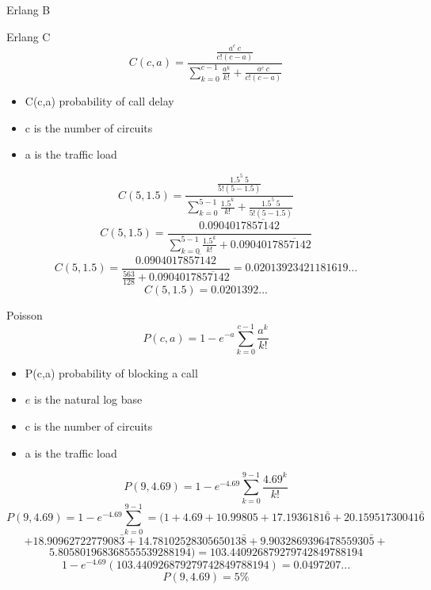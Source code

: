 \documentclass[landscape,fontscale=1,margin=0.2cm,paperwidth=70truecm, paperheight=40truecm,debug]{baposter}
\begin{document}
\begin{poster}
\begin{posterbox}[column=1]{Erlang B}
\end{posterbox}
\begin{posterbox}[column=1,below=auto]{Erlang C}
\[
C(c,a) = \frac{\frac{a^c~c}{c!(c-a)}}{\sum\limits_{k=0}^{c-1}\frac{a^k}{k!} + \frac{a^c~c}{c!(c-a)}}
\]
\begin{itemize}
\item C(c,a) probability of call delay
\item c is the number of circuits
\item a is the traffic load
\end{itemize}
\[
C(5,1.5) = \frac{\frac{1.5^5~5}{5!(5-1.5)}}{\sum\limits_{k=0}^{5-1}\frac{1.5^k}{k!} + \frac{1.5^5~5}{5!(5-1.5)}}
\]
\[
C(5,1.5) = \frac{0.0904017\overline{857142}}{\sum\limits_{k=0}^{5-1}\frac{1.5^k}{k!} + 0.0904017\overline{857142}}
\]
\[
C(5,1.5) = \frac{0.0904017\overline{857142}}{\frac{563}{128} + 0.0904017\overline{857142}} = 0.02013923421181619...
\]
\[
C(5,1.5) = 0.0201392...
\]

\end{posterbox}

\begin{posterbox}[column=1,below=auto,height=bottom]{Poisson}
\[
P(c,a) = 1 - e^{-a} \sum\limits_{k=0}^{c-1} \frac{a^k}{k!}
\]
\begin{itemize}
\item P(c,a) probability of blocking a call
\item $e$ is the natural log base
\item c is the number of circuits
\item a is the traffic load
\end{itemize}
\[
P(9,4.69) = 1 - e^{-4.69} \sum\limits_{k=0}^{9 - 1}\frac{4.69^k}{k!}
\]
\[
P(9,4.69) = 1 - e^{-4.69} \sum\limits_{k=0}^{9-1} = ( 1 + 4.69 + 10.99805 + 17.1936181\bar{6} + 20.15951730041\bar{6}
\]
\[
+ 18.9096272277908\bar{3} + 14.7810252830565013\bar{8} + 9.903286939647855930\bar{5} + 
\]
\[
5.80580196836855553928819\bar{4}) = 103.440926879279742849788194
\]
\[
1 - e^{-4.69}(103.440926879279742849788194) = 0.0497207...
\]
\[
P(9,4.69)= 5\% 
\]
\end{posterbox}


\end{poster}
\end{document}
